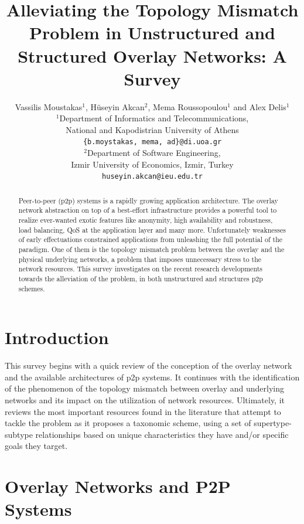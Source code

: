 \documentclass[acmcsur]{acmtrans2m}
\title{Alleviating the Topology Mismatch Problem in Unstructured and Structured Overlay Networks: A Survey}
\author{
Vassilis Moustakas$^1$, H\"useyin Akcan$^2$, Mema Roussopoulou$^1$ and Alex Delis$^1$\\
$^1$Department of Informatics and Telecommunications,\\
National and Kapodistrian University of Athens\\
\mbox{\texttt{\{b.moystakas, mema, ad\}@di.uoa.gr}}\\
$^2$Department of Software Engineering,\\
Izmir University of Economics, Izmir, Turkey \\
\mbox{\texttt{huseyin.akcan@ieu.edu.tr}}
}
\begin{document}
\maketitle

\begin{abstract}
Peer-to-peer (p2p) systems is a rapidly growing application architecture. The overlay network abstraction on top of a best-effort infrastructure provides a powerful tool to realize ever-wanted exotic features like anonymity, high availability and robustness, load balancing, QoS at the application layer and many more. Unfortunately weaknesses of early effectuations constrained applications from unleashing the full potential of the paradigm. One of them is the topology mismatch problem between the overlay and the physical underlying networks, a problem that imposes unnecessary stress to the network resources. This survey investigates on the recent research developments towards the alleviation of the problem, in both unstructured and structures p2p schemes.
\end{abstract}

\section{Introduction}



This survey begins with a quick review of the conception of the overlay network and the available architectures of p2p systems. It continues with the identification of the phenomenon of the topology mismatch between overlay and underlying networks and its impact on the utilization of network resources. Ultimately, it reviews the most important resources found in the literature that attempt to tackle the problem as it proposes a taxonomic scheme, using a set of supertype-subtype relationships based on unique characteristics they have and/or specific goals they target.

\section{Overlay Networks and P2P Systems}
\end{document}
